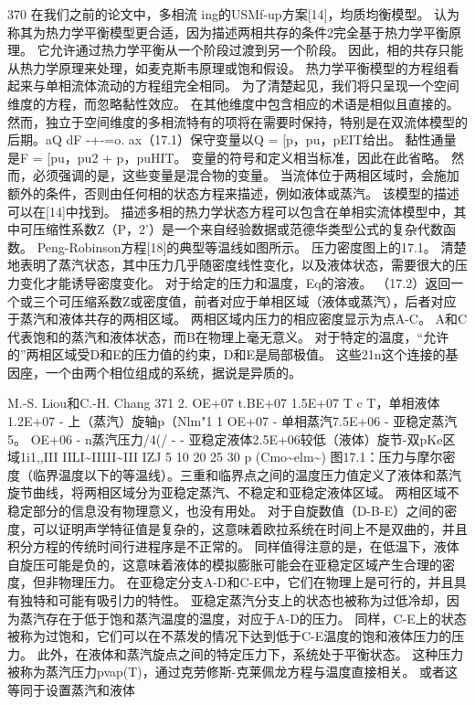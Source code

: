 \documentclass[UTF8,11pt,a4paper,openany,fontset=fandol]{ctexbook}
\begin{document}
370 在我们之前的论文中，多相流 ing的USMf-up方案[14]，均质均衡模型。 认为称其为热力学平衡模型更合适，因为描述两相共存的条件2完全基于热力学平衡原理。 它允许通过热力学平衡从一个阶段过渡到另一个阶段。 因此，相的共存只能从热力学原理来处理，如麦克斯韦原理或饱和假设。 热力学平衡模型的方程组看起来与单相流体流动的方程组完全相同。 为了清楚起见，我们将只呈现一个空间维度的方程，而忽略黏性效应。 在其他维度中包含相应的术语是相似且直接的。 然而，独立于空间维度的多相流特有的项将在需要时保持，特别是在双流体模型的后期。aQ dF -+-=o. ax（17.1）保守变量以Q = [p，pu，pEIT给出。 黏性通量是F = [pu，pu2 + p，puHIT。 变量的符号和定义相当标准，因此在此省略。 然而，必须强调的是，这些变量是混合物的变量。 当流体位于两相区域时，会施加额外的条件，否则由任何相的状态方程来描述，例如液体或蒸汽。 该模型的描述可以在[14]中找到。 描述多相的热力学状态方程可以包含在单相实流体模型中，其中可压缩性系数Z（P，2'）是一个来自经验数据或范德华类型公式的复杂代数函数。 Peng-Robinson方程[18]的典型等温线如图所示。 压力密度图上的17.1。 清楚地表明了蒸汽状态，其中压力几乎随密度线性变化，以及液体状态，需要很大的压力变化才能诱导密度变化。 对于给定的压力和温度，Eq的溶液。 （17.2）返回一个或三个可压缩系数Z或密度值，前者对应于单相区域（液体或蒸汽），后者对应于蒸汽和液体共存的两相区域。 两相区域内压力的相应密度显示为点A-C。 A和C代表饱和的蒸汽和液体状态，而B在物理上毫无意义。 对于特定的温度，“允许的”两相区域受D和E的压力值的约束，D和E是局部极值。 这些21n这个连接的基因座，一个由两个相位组成的系统，据说是异质的。

M.-S. Liou和C.-H. Chang 371 2. OE+07 t.BE+07 1.5E+07 T c T，单相液体1.2E+07 - 上（蒸汽）旋轴p（Nlm"1 1 OE+07 - 单相蒸汽7.5E+06 - 亚稳定蒸汽5。 OE+06 - n蒸汽压力/4(/ - - 亚稳定液体2.5E+06较低（液体）旋节-双pKe区域1i1,,III IILI\textasciitilde{}IIIII\textasciitilde{}III IZJ 5 10 20 25 30 p (Cmo\textasciitilde{}elm\textasciitilde{}) 图17.1：压力与摩尔密度（临界温度以下的等温线）。三重和临界点之间的温度压力值定义了液体和蒸汽旋节曲线，将两相区域分为亚稳定蒸汽、不稳定和亚稳定液体区域。 两相区域不稳定部分的信息没有物理意义，也没有用处。 对于自旋数值（D-B-E）之间的密度，可以证明声学特征值是复杂的，这意味着欧拉系统在时间上不是双曲的，并且积分方程的传统时间行进程序是不正常的。 同样值得注意的是，在低温下，液体自旋压可能是负的，这意味着液体的模拟膨胀可能会在亚稳定区域产生合理的密度，但非物理压力。 在亚稳定分支A-D和C-E中，它们在物理上是可行的，并且具有独特和可能有吸引力的特性。 亚稳定蒸汽分支上的状态也被称为过低冷却，因为蒸汽存在于低于饱和蒸汽温度的温度，对应于A-D的压力。 同样，C-E上的状态被称为过饱和，它们可以在不蒸发的情况下达到低于C-E温度的饱和液体压力的压力。 此外，在液体和蒸汽旋点之间的特定压力下，系统处于平衡状态。 这种压力被称为蒸汽压力pvap(T)，通过克劳修斯-克莱佩龙方程与温度直接相关。 或者这等同于设置蒸汽和液体
\end{document}
